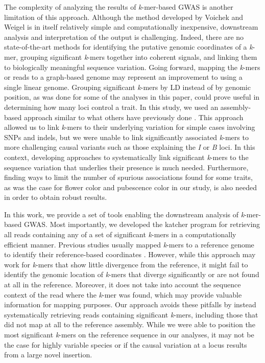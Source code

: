 \documentclass[doublespacing]{bmcart}
\begin{document}
The complexity of analyzing the results of \emph{k}-mer-based GWAS is another
limitation of this approach. Although the method developed by
Voichek and Weigel \cite{voichek2020} is in itself relatively simple and computationally
inexpensive, downstream analysis and interpretation of the output is
challenging. Indeed, there are no state-of-the-art methods for identifying the
putative genomic coordinates of a \emph{k}-mer, grouping significant
\emph{k}-mers together into coherent signals, and linking them to biologically
meaningful sequence variation. Going forward, mapping the \emph{k}-mers or
reads to a graph-based genome \citep[e.g. using the vg toolkit;][]{siren2021}
may represent an improvement to using a single linear genome.  Grouping
significant \emph{k}-mers by LD instead of by genomic position, as was done for
some of the analyses in this paper, could prove useful in determining how many
loci control a trait. In this study, we used an assembly-based approach similar
to what others have previously done \citep[e.g.][]{voichek2020, rahman2018}.
This approach allowed us to link \emph{k}-mers to their underlying variation
for simple cases involving SNPs and indels, but we were unable to link
significantly associated \emph{k}-mers to more challenging causal variants such
as those explaining the \emph{I} or \emph{B} loci. In this context, developing
approaches to systematically link significant \emph{k}-mers to the sequence
variation that underlies their presence is much needed. Furthermore, finding
ways to limit the number of spurious associations found for some traits, as was
the case for flower color and pubescence color in our study, is also needed in
order to obtain robust results.

In this work, we provide a set of tools enabling the downstream analysis of
\emph{k}-mer-based GWAS. Most importantly, we developed the katcher program for
retrieving all reads containing any of a set of significant \emph{k}-mers in a
computationally efficient manner. Previous studies usually mapped \emph{k}-mers
to a reference genome to identify their reference-based coordinates
\citep[e.g.][]{voichek2020, he2021, rahman2018, tripodi2021}.  However, while
this approach may work for \emph{k}-mers that show little divergence from the
reference, it might fail to identify the genomic location of \emph{k}-mers that
diverge significantly or are not found at all in the reference. Moreover, it
does not take into account the sequence context of the read where the
\emph{k}-mer was found, which may provide valuable information for mapping
purposes. Our approach avoids these pitfalls by instead systematically
retrieving reads containing significant \emph{k}-mers, including those that did
not map at all to the reference assembly. While we were able to position the
most significant \emph{k}-mers on the reference sequence in our analyses, it
may not be the case for highly variable species or if the causal variation at a
locus results from a large novel insertion.
\end{document}
